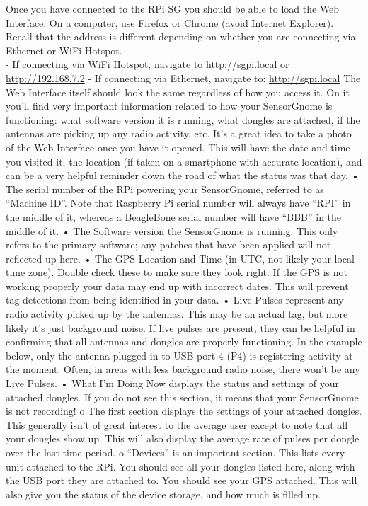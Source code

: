 \documentclass[
]{book}
\begin{document}
Once you have connected to the RPi SG you should be able to load the Web Interface. On a computer, use Firefox or Chrome (avoid Internet Explorer). Recall that the address is different depending on whether you are connecting via Ethernet or WiFi Hotspot.\\
- If connecting via WiFi Hotspot, navigate to \url{http://sgpi.local} or \url{http://192.168.7.2}
- If connecting via Ethernet, navigate to: \url{http://sgpi.local}
The Web Interface itself should look the same regardless of how you access it. On it you'll find very important information related to how your SensorGnome is functioning: what software version it is running, what dongles are attached, if the antennas are picking up any radio activity, etc. It's a great idea to take a photo of the Web Interface once you have it opened. This will have the date and time you visited it, the location (if taken on a smartphone with accurate location), and can be a very helpful reminder down the road of what the status was that day.
• The serial number of the RPi powering your SensorGnome, referred to as ``Machine ID''. Note that Raspberry Pi serial number will always have ``RPI'' in the middle of it, whereas a BeagleBone serial number will have ``BBB'' in the middle of it.
• The Software version the SensorGnome is running. This only refers to the primary software; any patches that have been applied will not reflected up here.
• The GPS Location and Time (in UTC, not likely your local time zone). Double check these to make sure they look right. If the GPS is not working properly your data may end up with incorrect dates. This will prevent tag detections from being identified in your data.
• Live Pulses represent any radio activity picked up by the antennas. This may be an actual tag, but more likely it's just background noise. If live pulses are present, they can be helpful in confirming that all antennas and dongles are properly functioning. In the example below, only the antenna plugged in to USB port 4 (P4) is registering activity at the moment. Often, in areas with less background radio noise, there won't be any Live Pulses.
• What I'm Doing Now displays the status and settings of your attached dongles. If you do not see this section, it means that your SensorGnome is not recording!
o The first section displays the settings of your attached dongles. This generally isn't of great interest to the average user except to note that all your dongles show up. This will also display the average rate of pulses per dongle over the last time period.
o ``Devices'' is an important section. This lists every unit attached to the RPi. You should see all your dongles listed here, along with the USB port they are attached to. You should see your GPS attached. This will also give you the status of the device storage, and how much is filled up.
\end{document}
